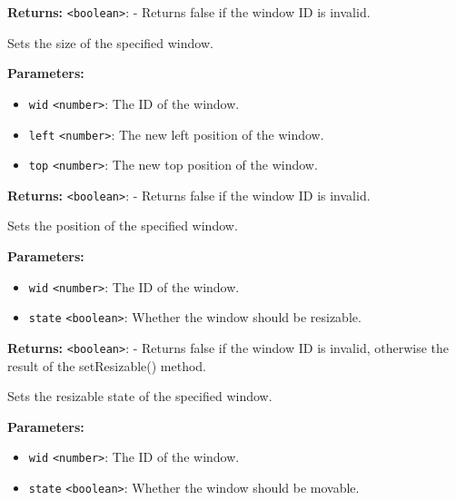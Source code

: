 \documentclass[12pt,a4paper]{article}
\begin{document}
\noindent \textbf{Returns:} \texttt{<boolean>}: - Returns false if the window ID is invalid.

\noindent Sets the size of the specified window.

\vspace{5mm}
\noindent {}


\noindent \textbf{Parameters:}
\begin{itemize}
  \item \texttt{wid} \texttt{<number>}: The ID of the window.
  \item \texttt{left} \texttt{<number>}: The new left position of the window.
  \item \texttt{top} \texttt{<number>}: The new top position of the window.
\end{itemize}

\noindent \textbf{Returns:} \texttt{<boolean>}: - Returns false if the window ID is invalid.

\noindent Sets the position of the specified window.

\vspace{5mm}
\noindent {}


\noindent \textbf{Parameters:}
\begin{itemize}
  \item \texttt{wid} \texttt{<number>}: The ID of the window.
  \item \texttt{state} \texttt{<boolean>}: Whether the window should be resizable.
\end{itemize}

\noindent \textbf{Returns:} \texttt{<boolean>}: - Returns false if the window ID is invalid, otherwise the result of the setResizable() method.

\noindent Sets the resizable state of the specified window.

\vspace{5mm}
\noindent {}


\noindent \textbf{Parameters:}
\begin{itemize}
  \item \texttt{wid} \texttt{<number>}: The ID of the window.
  \item \texttt{state} \texttt{<boolean>}: Whether the window should be movable.
\end{itemize}
\end{document}
